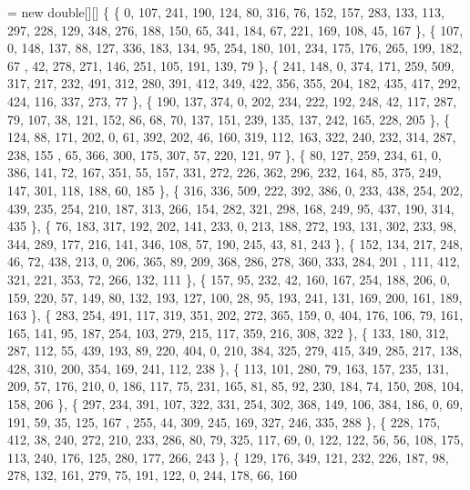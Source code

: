 \begin{DoxyCode}
= \textcolor{keyword}{new} \textcolor{keywordtype}{double}[][] \{
            \{ 0, 107, 241, 190, 124, 80, 316, 76, 152, 157, 283, 133, 113, 297, 228, 129, 348, 276, 188, 
      150, 65, 341, 184, 67, 221, 169, 108, 45, 167 \},
            \{ 107, 0, 148, 137, 88, 127, 336, 183, 134, 95, 254, 180, 101, 234, 175, 176, 265, 199, 182, 67
      , 42, 278, 271, 146, 251, 105, 191, 139, 79 \},
            \{ 241, 148, 0, 374, 171, 259, 509, 317, 217, 232, 491, 312, 280, 391, 412, 349, 422, 356, 355, 
      204, 182, 435, 417, 292, 424, 116, 337, 273, 77 \},
            \{ 190, 137, 374, 0, 202, 234, 222, 192, 248, 42, 117, 287, 79, 107, 38, 121, 152, 86, 68, 70, 
      137, 151, 239, 135, 137, 242, 165, 228, 205 \},
            \{ 124, 88, 171, 202, 0, 61, 392, 202, 46, 160, 319, 112, 163, 322, 240, 232, 314, 287, 238, 155
      , 65, 366, 300, 175, 307, 57, 220, 121, 97 \},
            \{ 80, 127, 259, 234, 61, 0, 386, 141, 72, 167, 351, 55, 157, 331, 272, 226, 362, 296, 232, 164,
       85, 375, 249, 147, 301, 118, 188, 60, 185 \},
            \{ 316, 336, 509, 222, 392, 386, 0, 233, 438, 254, 202, 439, 235, 254, 210, 187, 313, 266, 154, 
      282, 321, 298, 168, 249, 95, 437, 190, 314, 435 \},
            \{ 76, 183, 317, 192, 202, 141, 233, 0, 213, 188, 272, 193, 131, 302, 233, 98, 344, 289, 177, 
      216, 141, 346, 108, 57, 190, 245, 43, 81, 243 \},
            \{ 152, 134, 217, 248, 46, 72, 438, 213, 0, 206, 365, 89, 209, 368, 286, 278, 360, 333, 284, 201
      , 111, 412, 321, 221, 353, 72, 266, 132, 111 \},
            \{ 157, 95, 232, 42, 160, 167, 254, 188, 206, 0, 159, 220, 57, 149, 80, 132, 193, 127, 100, 28, 
      95, 193, 241, 131, 169, 200, 161, 189, 163 \},
            \{ 283, 254, 491, 117, 319, 351, 202, 272, 365, 159, 0, 404, 176, 106, 79, 161, 165, 141, 95, 
      187, 254, 103, 279, 215, 117, 359, 216, 308, 322 \},
            \{ 133, 180, 312, 287, 112, 55, 439, 193, 89, 220, 404, 0, 210, 384, 325, 279, 415, 349, 285, 
      217, 138, 428, 310, 200, 354, 169, 241, 112, 238 \},
            \{ 113, 101, 280, 79, 163, 157, 235, 131, 209, 57, 176, 210, 0, 186, 117, 75, 231, 165, 81, 85, 
      92, 230, 184, 74, 150, 208, 104, 158, 206 \},
            \{ 297, 234, 391, 107, 322, 331, 254, 302, 368, 149, 106, 384, 186, 0, 69, 191, 59, 35, 125, 167
      , 255, 44, 309, 245, 169, 327, 246, 335, 288 \},
            \{ 228, 175, 412, 38, 240, 272, 210, 233, 286, 80, 79, 325, 117, 69, 0, 122, 122, 56, 56, 108, 
      175, 113, 240, 176, 125, 280, 177, 266, 243 \},
            \{ 129, 176, 349, 121, 232, 226, 187, 98, 278, 132, 161, 279, 75, 191, 122, 0, 244, 178, 66, 160

\end{DoxyCode}
